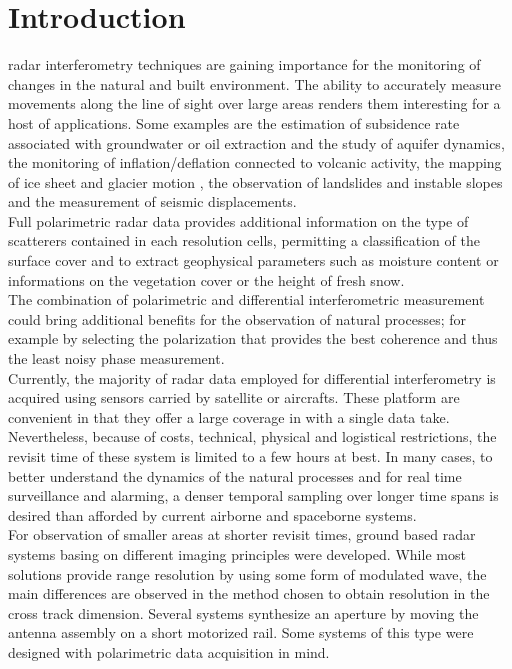 \section{Introduction}
 radar interferometry\cite{Gabriel1989, Massonnet1993} techniques are gaining importance for the monitoring of changes in the natural and built environment. The ability to accurately measure movements along the line of sight over large areas renders them interesting for a host of applications. Some examples are the estimation of subsidence rate associated with groundwater or oil extraction and the study of aquifer dynamics\cite{Fielding1998,Strozzi2001,Galloway2007a}, the monitoring of inflation/deflation connected to volcanic activity\cite{Massonnet1995}, the mapping of ice sheet and glacier motion\cite{Goldstein1993,Mohr1998} , the observation of landslides and instable slopes\cite{Carnec1996,Catani2005} and the measurement of seismic displacements\cite{Massonnet1993b,Zebker1994}.\\
Full polarimetric radar data provides additional information on the type of scatterers contained in each resolution cells, permitting a classification of the surface cover\cite{Cloude1997, Lee1999} and to extract geophysical parameters such as moisture content\cite{Hajnsek2003} or informations on the vegetation cover\cite{Ulaby1987} or the height of fresh snow\cite{Leinss2014}.\\
The combination of polarimetric and differential interferometric measurement could bring additional benefits for the observation of natural processes; for example by selecting the polarization that provides the best coherence and thus the least noisy phase measurement\cite{Pipia2009a, Iglesias2014b}.\\
Currently, the majority of radar data employed for differential interferometry is acquired using sensors carried by satellite or aircrafts. These platform are convenient in that they offer a large coverage in with a single data take. Nevertheless, because of costs, technical, physical and logistical restrictions, the revisit time of these system is limited to a few hours at best. 
In many cases, to better understand the dynamics of the natural processes and for real time surveillance and alarming, a denser temporal sampling over longer time spans is desired than afforded by current airborne and spaceborne systems.\\
For observation of smaller areas at shorter revisit times, ground based radar systems basing on different imaging principles were developed. While most  solutions provide range resolution by using some form of modulated wave, the main differences are observed in the method chosen to obtain resolution in the cross track dimension. 
Several systems\cite{Rudolf1999a, Rodelsperger2011, Aguasca2004,Rodelsperger2012} synthesize an aperture by moving the antenna assembly on a short motorized rail. Some systems of this type were designed with polarimetric data acquisition in mind\cite{Iglesias2014,LEE, Kang2009}.\\
